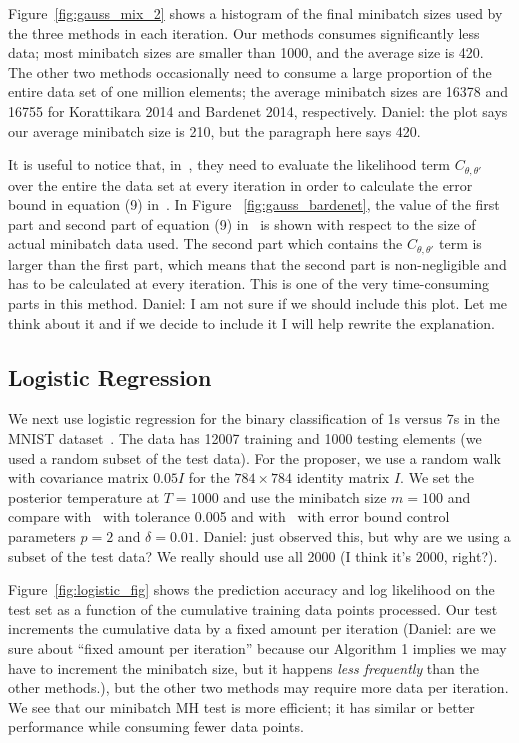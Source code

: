 \documentclass{article}
\begin{document}
Figure~\ref{fig:gauss_mix_2} shows a histogram of the final minibatch sizes used
by the three methods in each iteration. Our methods consumes significantly less
data; most minibatch sizes are smaller than 1000, and the average size is 420.
The other two methods occasionally need to consume a large proportion of the
entire data set of one million elements; the average minibatch sizes are 16378
and 16755 for Korattikara 2014 and Bardenet 2014, respectively. {\color{blue}
Daniel: the plot says our average minibatch size is 210, but the paragraph here
says 420.}

It is useful to notice that, in~\cite{icml2014c1_bardenet14}, they need to
evaluate the likelihood term $C_{\theta,\theta'}$ over the entire the data set
at every iteration in order to calculate the error bound in equation (9)
in~\cite{icml2014c1_bardenet14}. In Figure ~\ref{fig:gauss_bardenet}, the value
of the first part and second part of equation (9)
in~\cite{icml2014c1_bardenet14} is shown with respect to the size of actual
minibatch data used. The second part which contains  the $C_{\theta,\theta'}$
term is larger than the first part, which means that the second part is
non-negligible and has to be calculated at every iteration. This is one of the
very time-consuming parts in this method.  {\color{blue} Daniel: I am not sure
if we should include this plot. Let me think about it and if we decide to
include it I will help rewrite the explanation.}


\subsection{Logistic Regression}\label{ssec:logistic}

We next use logistic regression for the binary classification of 1s versus 7s in
the MNIST dataset~\cite{lecun-mnisthandwrittendigit-2010}. The data has 12007
training and 1000 testing elements (we used a random subset of the test data).
For the proposer, we use a random walk with covariance matrix $0.05I$ for the
$784\times 784$ identity matrix $I$. We set the posterior temperature at
$T=1000$ and use the minibatch size $m=100$ and compare
with~\cite{cutting_mh_2014} with tolerance 0.005 and
with~\cite{icml2014c1_bardenet14} with error bound control parameters $p = 2$
and $\delta = 0.01$. {\color{blue} Daniel: just observed this, but why are we
using a subset of the test data? We really should use all 2000 (I think it's
2000, right?).}

Figure~\ref{fig:logistic_fig} shows the prediction accuracy and log likelihood
on the test set as a function of the cumulative training data points processed.
Our test increments the cumulative data by a fixed amount per iteration
{\color{blue} (Daniel: are we sure about ``fixed amount per iteration'' because
our Algorithm 1 implies we may have to increment the minibatch size, but it
happens \emph{less frequently} than the other methods.)}, but the other two
methods may require more data per iteration. We see that our minibatch MH test
is more efficient; it has similar or better performance while consuming fewer
data points.
\end{document}
